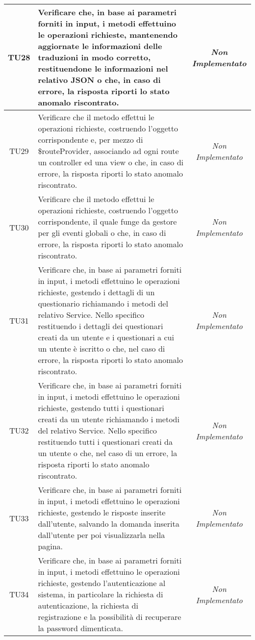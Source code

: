 \begin{longtable}{|c|>{}m{10cm}|c|}
\hypertarget{TU28}{TU28} & Verificare che, in base ai parametri forniti in input, i metodi effettuino le operazioni richieste, mantenendo aggiornate le informazioni delle traduzioni in modo corretto, restituendone le informazioni nel relativo JSON o che, in caso di errore, la risposta riporti lo stato anomalo riscontrato. & \textit{Non Implementato}\\ \hline
\hypertarget{TU29}{TU29} & Verificare che il metodo effettui le operazioni richieste, costruendo l’oggetto corrispondente e, per mezzo
di \$routeProvider, associando ad ogni route un controller ed una view o che, in caso di errore, la
risposta riporti lo stato anomalo riscontrato. & \textit{Non Implementato}\\ \hline
\hypertarget{TU30}{TU30} & Verificare che il metodo effettui le operazioni richieste, costruendo l’oggetto corrispondente, il quale funge da gestore per gli eventi globali o che, in caso di
errore, la risposta riporti lo stato anomalo riscontrato. & \textit{Non Implementato}\\ \hline
\hypertarget{TU31}{TU31} & Verificare che, in base ai parametri forniti in input, i metodi effettuino le operazioni richieste, gestendo i dettagli di un questionario richiamando i metodi del relativo Service. Nello specifico restituendo i dettagli dei questionari creati da un utente e i questionari a cui un utente è iscritto o che, nel caso di errore, la risposta riporti lo stato anomalo riscontrato. & \textit{Non Implementato}\\ \hline
\hypertarget{TU32}{TU32} & Verificare che, in base ai parametri forniti in input, i metodi effettuino le operazioni richieste, gestendo tutti i questionari creati da un utente richiamando i metodi del relativo Service. Nello specifico restituendo tutti i questionari creati da un utente o che, nel caso di un errore, la risposta riporti lo stato anomalo riscontrato.  & \textit{Non Implementato}\\ \hline
\hypertarget{TU33}{TU33} & Verificare che, in base ai parametri forniti in input, i metodi effettuino le operazioni richieste, gestendo le risposte inserite dall'utente, salvando la domanda inserita dall'utente per poi visualizzarla nella pagina. & \textit{Non Implementato}\\ \hline
\hypertarget{TU34}{TU34} & Verificare che, in base ai parametri forniti in input, i metodi effettuino le operazioni richieste, gestendo l'autenticazione al sistema, in particolare la richiesta di autenticazione, la richiesta di registrazione e la possibilità di recuperare la password dimenticata. & \textit{Non Implementato}\\ \hline

\end{longtable}
